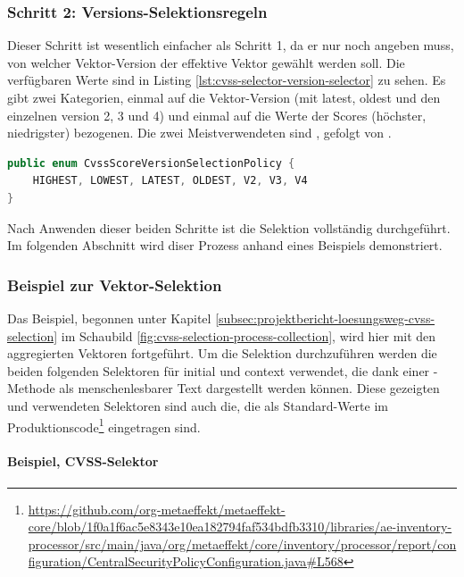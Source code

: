 \subsubsection{Schritt 2: Versions-Selektionsregeln} \label{subsubsec:projektbericht-loesungsweg-cvss-selection-rules-2}

Dieser Schritt ist wesentlich einfacher als Schritt 1, da er nur noch angeben muss, von welcher Vektor-Version der effektive Vektor gewählt werden soll.
Die verfügbaren Werte sind in Listing \ref{lst:cvss-selector-version-selector} zu sehen.
Es gibt zwei Kategorien, einmal auf die Vektor-Version (mit latest, oldest und den einzelnen version 2, 3 und 4) und einmal auf die Werte der Scores (höchster, niedrigster) bezogenen.
Die zwei Meistverwendeten sind , gefolgt von .

\begin{lstlisting}[language=Java, label={lst:cvss-selector-version-selector}, caption={Gültige Werte für die Versions-Selektion}]
public enum CvssScoreVersionSelectionPolicy {
    HIGHEST, LOWEST, LATEST, OLDEST, V2, V3, V4
}
\end{lstlisting}

Nach Anwenden dieser beiden Schritte ist die Selektion vollständig durchgeführt.
Im folgenden Abschnitt wird diser Prozess anhand eines Beispiels demonstriert.

\subsubsection{Beispiel zur Vektor-Selektion} \label{subsubsec:projektbericht-loesungsweg-cvss-selection-example}

Das Beispiel, begonnen unter Kapitel \ref{subsec:projektbericht-loesungsweg-cvss-selection} im Schaubild \ref{fig:cvss-selection-process-collection}, wird hier mit den aggregierten Vektoren fortgeführt.
Um die Selektion durchzuführen werden die beiden folgenden Selektoren für initial und context verwendet, die dank einer -Methode als menschenlesbarer Text dargestellt werden können.
Diese gezeigten und verwendeten Selektoren sind auch die, die als Standard-Werte im Produktionscode\footnote{\url{https://github.com/org-metaeffekt/metaeffekt-core/blob/1f0a1f6ac5e8343e10ea182794faf534bdfb3310/libraries/ae-inventory-processor/src/main/java/org/metaeffekt/core/inventory/processor/report/configuration/CentralSecurityPolicyConfiguration.java\#L568}} eingetragen sind.

\paragraph{Beispiel, CVSS-Selektor } \label{par:projektbericht-loesungsweg-cvss-selection-example-selector-initial}

